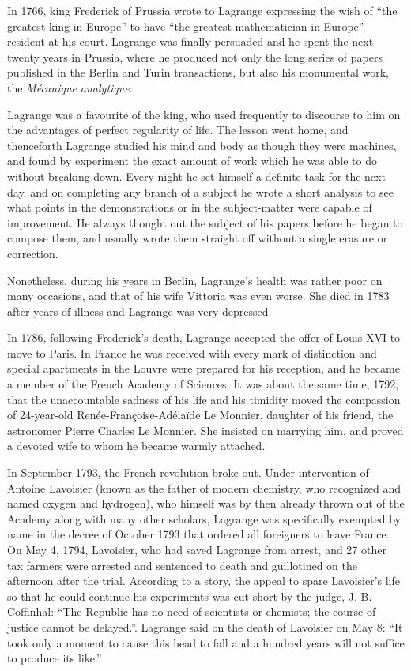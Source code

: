 \documentclass[b5paper]{article}
\begin{document}
In 1766, king Frederick of Prussia wrote to Lagrange expressing the wish of ``the greatest king in Europe'' to have ``the greatest mathematician in Europe'' resident at his court. Lagrange was finally persuaded and he spent the next twenty years in Prussia, where he produced not only the long series of papers published in the Berlin and Turin transactions, but also his monumental work, the {\em Mécanique analytique}.

Lagrange was a favourite of the king, who used frequently to discourse to him on the advantages of perfect regularity of life. The lesson went home, and thenceforth Lagrange studied his mind and body as though they were machines, and found by experiment the exact amount of work which he was able to do without breaking down. Every night he set himself a definite task for the next day, and on completing any branch of a subject he wrote a short analysis to see what points in the demonstrations or in the subject-matter were capable of improvement. He always thought out the subject of his papers before he began to compose them, and usually wrote them straight off without a single erasure or correction.

Nonetheless, during his years in Berlin, Lagrange's health was rather poor on many occasions, and that of his wife Vittoria was even worse. She died in 1783 after years of illness and Lagrange was very depressed.

In 1786, following Frederick's death, Lagrange accepted the offer of Louis XVI to move to Paris. In France he was received with every mark of distinction and special apartments in the Louvre were prepared for his reception, and he became a member of the French Academy of Sciences. It was about the same time, 1792, that the unaccountable sadness of his life and his timidity moved the compassion of 24-year-old Renée-Françoise-Adélaïde Le Monnier, daughter of his friend, the astronomer Pierre Charles Le Monnier. She insisted on marrying him, and proved a devoted wife to whom he became warmly attached.

In September 1793, the French revolution broke out. Under intervention of Antoine Lavoisier (known as the father of modern chemistry, who recognized and named oxygen and hydrogen), who himself was by then already thrown out of the Academy along with many other scholars, Lagrange was specifically exempted by name in the decree of October 1793 that ordered all foreigners to leave France. On May 4, 1794, Lavoisier, who had saved Lagrange from arrest, and 27 other tax farmers were arrested and sentenced to death and guillotined on the afternoon after the trial. According to a story, the appeal to spare Lavoisier's life so that he could continue his experiments was cut short by the judge, J. B. Coffinhal: ``The Republic has no need of scientists or chemists; the course of justice cannot be delayed.''. Lagrange said on the death of Lavoisier on May 8: ``It took only a moment to cause this head to fall and a hundred years will not suffice to produce its like.''\cite{Wiki-Lagrange}
\end{document}
